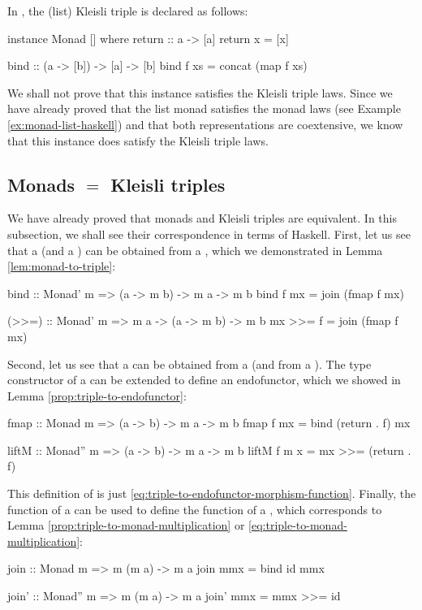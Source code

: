 \begin{example}
  \label{ex:triple-list-haskell}

  In \hask, the \texthaskell{[]} (list) Kleisli triple is declared as
  follows:
  \begin{codehaskell}
instance Monad [] where
  return :: a -> [a]
  return x = [x]

  bind :: (a -> [b]) -> [a] -> [b]
  bind f xs = concat (map f xs)
  \end{codehaskell}
  We shall not prove that this instance satisfies the Kleisli triple
  laws. Since we have already proved that the list monad satisfies the
  monad laws (see Example \ref{ex:monad-list-haskell}) and that both
  representations are coextensive, we know that this instance does
  satisfy the Kleisli triple laws.

\end{example}

\subsection*{Monads $=$ Kleisli triples}

We have already proved that monads and Kleisli triples are equivalent.
In this subsection, we shall see their correspondence in terms of
Haskell. First, let us see that a  (and a
) can be obtained from a ,
which we demonstrated in Lemma \ref{lem:monad-to-triple}:
\begin{codehaskell}
bind :: Monad' m => (a -> m b) -> m a -> m b
bind f mx = join (fmap f mx)

(>>=) :: Monad' m => m a -> (a -> m b) -> m b
mx >>= f = join (fmap f mx)
\end{codehaskell}

Second, let us see that a  can be obtained from a
 (and from a ). The type
constructor of a  can be extended to define an
endofunctor, which we showed in Lemma
\ref{prop:triple-to-endofunctor}:
\begin{codehaskell}
fmap :: Monad m => (a -> b) -> m a -> m b
fmap f mx = bind (return . f) mx

liftM :: Monad'' m => (a -> b) -> m a -> m b
liftM f m x = mx >>= (return . f)
\end{codehaskell}
This definition of  is just
\eqref{eq:triple-to-endofunctor-morphism-function}. Finally, the
 function of a  can be used to
define the  function of a ,
which corresponds to Lemma \ref{prop:triple-to-monad-multiplication}
or \eqref{eq:triple-to-monad-multiplication}:
\begin{codehaskell}
join :: Monad m => m (m a) -> m a
join mmx = bind id mmx

join' :: Monad'' m => m (m a) -> m a
join' mmx = mmx >>= id
\end{codehaskell}

